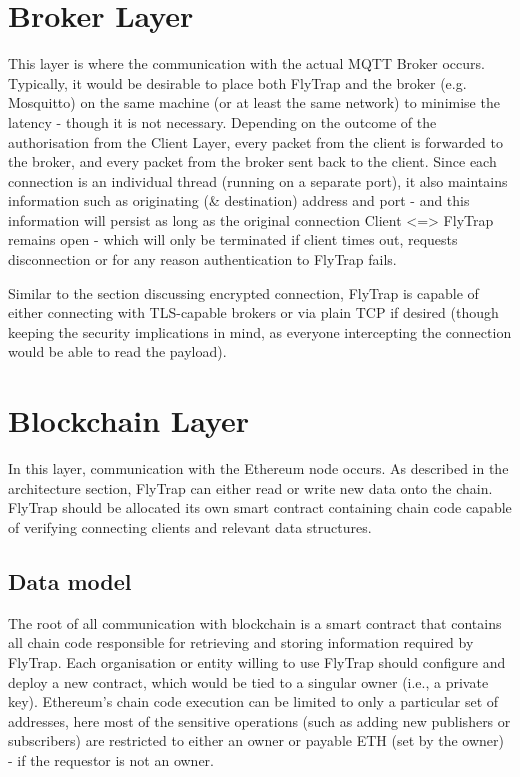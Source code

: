 \section{Broker Layer}

This layer is where the communication with the actual MQTT Broker occurs. Typically, it would be desirable to place both FlyTrap and the broker (e.g. Mosquitto) on the same machine (or at least the same network) to minimise the latency - though it is not necessary. Depending on the outcome of the authorisation from the Client Layer, every packet from the client is forwarded to the broker, and every packet from the broker sent back to the client. Since each connection is an individual thread (running on a separate port), it also maintains information such as originating (\& destination) address and port - and this information will persist as long as the original connection Client <=> FlyTrap remains open - which will only be terminated if client times out, requests disconnection or for any reason authentication to FlyTrap fails.

Similar to the section discussing encrypted connection, FlyTrap is capable of either connecting with TLS-capable brokers or via plain TCP if desired (though keeping the security implications in mind, as everyone intercepting the connection would be able to read the payload).

\section{Blockchain Layer}
In this layer, communication with the Ethereum node occurs. As described in the architecture section, FlyTrap can either read or write new data onto the chain. FlyTrap should be allocated its own smart contract containing chain code capable of verifying connecting clients and relevant data structures. 
\subsection{Data model}
The root of all communication with blockchain is a smart contract that contains all chain code responsible for retrieving and storing information required by FlyTrap. Each organisation or entity willing to use FlyTrap should configure and deploy a new contract, which would be tied to a singular owner (i.e., a private key). Ethereum's chain code execution can be limited to only a particular set of addresses, here most of the sensitive operations (such as adding new publishers or subscribers) are restricted to either an owner or payable ETH (set by the owner) - if the requestor is not an owner.

